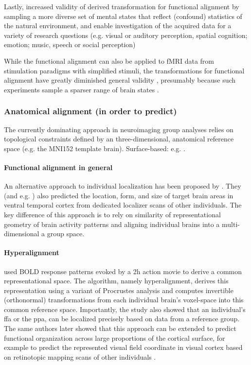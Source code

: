 %
Lastly, increased validity of derived transformation for functional alignment by
sampling a more diverse set of mental states that reflect (confound) statistics
of the natural environment, and enable investigation of the acquired data for a
variety of research questions (e.g. visual or auditory perception, spatial
cognition; emotion; music, speech or social perception)

%
While the functional alignment can also be applied to fMRI data from stimulation
paradigms with simplified stimuli, the transformations for functional alignment
have greatly diminished general validity \citep{haxby2011common}, presumably
because such experiments sample a sparser range of brain states
\citep{guntupalli2016model}.

\subsubsection{Anatomical alignment (in order to predict)}

The currently dominating approach in neuroimaging group analyses relies on
topological constraints defined by an three-dimensional, anatomical reference
space (e.g. the MNI152 template brain).
%
Surface-based: e.g. \citep{weiner2018defining}.

\paragraph{Functional alignment in general}
%
An alternative approach to individual localization has been proposed by
\citet{haxby2011common}.
%
They (and e.g. \citet{jiahui2019predicting}) also predicted the location, form,
and size of  target brain areas in ventral temporal cortex from dedicated
localizer scans of other individuals.
%
The key difference of this approach is to rely on similarity of representational
geometry of brain activity patterns and aligning individual brains into a
multi-dimensional a group space.



\paragraph{Hyperalignment}

%
\citet{haxby2011common} used BOLD response patterns evoked by a 2h action movie
to derive a common representational space.
%
The algorithm, namely hyperalignment, derives this representation using a
variant of Procrustes analysis and computes invertible (orthonormal)
transformations from each individual brain’s voxel-space into this common
reference space.
%
Importantly, the study also showed that an individual's \ac{ffa} or the
\ac{ppa}, can be localized precisely based on data from a reference group.
%
The same authors later showed that this approach can be extended to predict
functional organization across large proportions of the cortical surface, for
example to predict the represented visual field coordinate in visual cortex
based on retinotopic mapping scans of other individuals
\citep{guntupalli2016model}.

